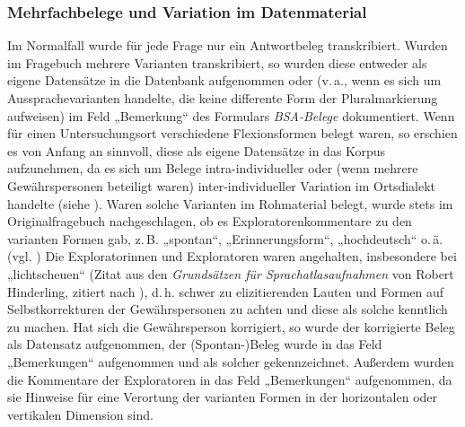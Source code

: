 \subsubsection{Mehrfachbelege und Variation im Datenmaterial}
\label{sec:6.3.1.3}
Im Normalfall wurde für jede Frage nur ein Antwortbeleg transkribiert. Wurden im Fragebuch mehrere Varianten transkribiert, so wurden diese entweder als eigene Datensätze in die Datenbank aufgenommen oder (v.\,a., wenn es sich um Aussprachevarianten handelte, die keine differente Form der Pluralmarkierung aufweisen) im Feld „Bemerkung“ des Formulars \textit{BSA-Belege} dokumentiert. Wenn für einen Untersuchungsort verschiedene Flexionsformen belegt waren, so erschien es von Anfang an sinnvoll, diese als eigene Datensätze in das Korpus aufzunehmen, da es sich um Belege intra-individueller oder (wenn mehrere Gewährspersonen beteiligt waren) inter-individueller Variation im Ortsdialekt handelte (siehe \citealt{Nickel2021}). Waren solche Varianten im Rohmaterial belegt, wurde stets im Originalfragebuch nachgeschlagen, ob es Exploratorenkommentare zu den varianten Formen gab, z.\,B. „spontan“, „Erinnerungsform“, „hochdeutsch“ o.\,ä. (vgl. \citealt[165f.]{SBS1}) Die Exploratorinnen und Exploratoren waren angehalten, insbesondere bei „lichtscheuen“ (Zitat aus den \textit{Grundsätzen für Sprachatlasaufnahmen} von Robert Hinderling, zitiert nach \citealt[48]{Schmuck2014}), d.\,h. schwer zu elizitierenden Lauten und Formen auf Selbstkorrekturen der Gewährspersonen zu achten und diese als solche kenntlich zu machen. Hat sich die Gewährsperson korrigiert, so wurde der korrigierte Beleg als Datensatz aufgenommen, der (Spontan-)Beleg wurde in das Feld „Bemerkungen“ aufgenommen und als solcher gekennzeichnet. Außerdem wurden die Kommentare der Exploratoren in das Feld „Bemerkungen“ aufgenommen, da sie Hinweise für eine Verortung der varianten Formen in der horizontalen oder vertikalen Dimension sind.

